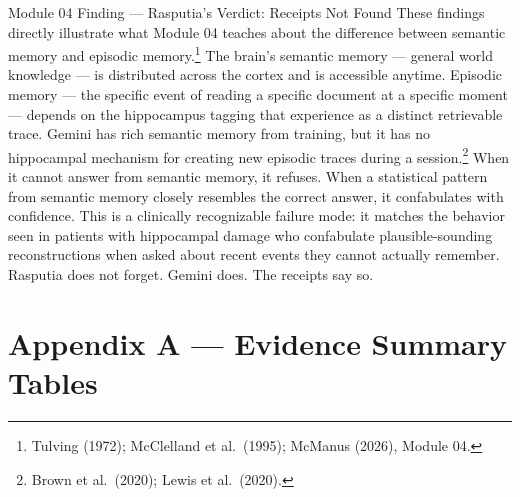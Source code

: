 \documentclass[12pt, a4paper]{article}
\begin{document}
\begin{findingbox}{Module 04 Finding — Rasputia's Verdict: Receipts Not Found}
These findings directly illustrate what Module 04 teaches about the difference between semantic memory and episodic memory.\footnote{Tulving (1972); McClelland et al.\ (1995); McManus (2026), Module 04.} The brain's semantic memory — general world knowledge — is distributed across the cortex and is accessible anytime. Episodic memory — the specific event of reading a specific document at a specific moment — depends on the hippocampus tagging that experience as a distinct retrievable trace. Gemini has rich semantic memory from training, but it has no hippocampal mechanism for creating new episodic traces during a session.\footnote{Brown et al.\ (2020); Lewis et al.\ (2020).} When it cannot answer from semantic memory, it refuses. When a statistical pattern from semantic memory closely resembles the correct answer, it confabulates with confidence. This is a clinically recognizable failure mode: it matches the behavior seen in patients with hippocampal damage who confabulate plausible-sounding reconstructions when asked about recent events they cannot actually remember. Rasputia does not forget. Gemini does. The receipts say so.
\end{findingbox}

\newpage

\section{Appendix A — Evidence Summary Tables}
\label{sec:evidence_tables}
\end{document}
